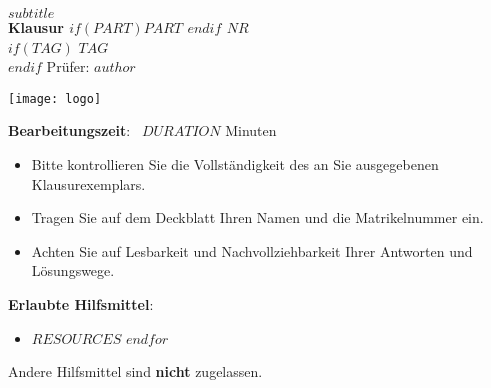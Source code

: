 
\begin{coverpages}
    \begin{minipage}[c]{0.75\textwidth}
        \parindent0pt
        \textcolor{headcolor}{\large\scshape{$subtitle$}}\\[1ex]
        \textcolor{headcolor}{\Large\textbf{Klausur $if(PART)$$PART$ \xspace$endif$ $NR$}}\\[2ex]
        $if(TAG)$
        \textbf{$TAG$}\\[2ex]
        $endif$
        \parindent0pt
        \textcolor{headcolor}{Prüfer:} $author$
    \end{minipage}
    \begin{minipage}[c]{0.25\textwidth}
        \texttt{[image: logo]}
    \end{minipage}
    \vspace{10mm}
    \par\hrulefill\par
    \begin{minipage}[c]{0.5\textwidth}
        \begin{minipage}[c]{0.96\textwidth}
            \vspace{2mm}
            {\textbf{Bearbeitungszeit}: {\ }$DURATION$ Minuten}\par
            \bigskip
            \begin{itemize}
                \item Bitte kontrollieren Sie die Vollständigkeit des an Sie
                ausgegebenen Klausurexemplars.
                \medskip
                \item Tragen Sie auf dem Deckblatt Ihren Namen und die
                Matrikelnummer ein.
                \medskip
                \item Achten Sie auf Lesbarkeit und Nachvollziehbarkeit Ihrer
                Antworten und Lösungswege.
                \medskip
            \end{itemize}
            \textbf{Erlaubte Hilfsmittel}:
                    \begin{itemize}
                        $for(RESOURCES)$
                        \item $RESOURCES$
                        $endfor$
                    \end{itemize}
                \smallskip
            {\color{dkred}Andere Hilfsmittel sind \textbf{nicht} zugelassen.

}
\end{minipage}
\end{minipage}
\end{coverpages}
